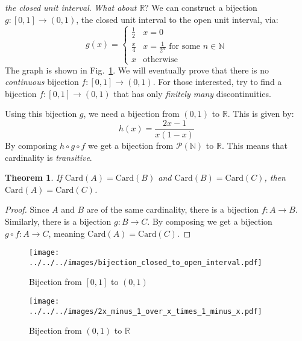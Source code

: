 \documentclass{article}
\theoremstyle{plain}
\newtheorem{theorem}{Theorem}[section]
\theoremstyle{normal}
\begin{document}
        \textit{the closed unit interval}. \textit{What about} $\mathbb{R}$?
        We can construct a bijection $g:[0,1]\rightarrow(0,1)$, the closed
        unit interval to the open unit interval, via:
        \begin{equation}
            g(x)=
            \begin{cases}
                \frac{1}{2}&x=0\\
                \frac{x}{4}&x=\frac{1}{2^{n}}\textrm{ for some }n\in\mathbb{N}\\
                x&\textrm{otherwise}
            \end{cases}
        \end{equation}
        The graph is shown in Fig.~\ref{fig:bijection_closed_to_open_interval}.
        We will eventually prove that there is no \textit{continuous} bijection
        $f:[0,1]\rightarrow(0,1)$. For those interested, try to find a
        bijection $f:[0,1]\rightarrow(0,1)$ that has only
        \textit{finitely many} discontinuities.
        \par\hfill\par
        Using this bijection $g$, we need a bijection from $(0,1)$ to
        $\mathbb{R}$. This is given by:
        \begin{equation}
            h(x)=\frac{2x-1}{x(1-x)}
        \end{equation}
        By composing $h\circ{g}\circ{f}$ we get a bijection from
        $\mathcal{P}(\mathbb{N})$ to $\mathbb{R}$. This means that cardinality
        is \textit{transitive}.
        \begin{theorem}
            If $\textrm{Card}(A)=\textrm{Card}(B)$ and
            $\textrm{Card}(B)=\textrm{Card}(C)$, then
            $\textrm{Card}(A)=\textrm{Card}(C)$.
        \end{theorem}
        \begin{proof}
            Since $A$ and $B$ are of the same cardinality, there is a
            bijection $f:A\rightarrow{B}$. Similarly, there is a bijection
            $g:B\rightarrow{C}$. By composing we get a bijection
            $g\circ{f}:A\rightarrow{C}$, meaning
            $\textrm{Card}(A)=\textrm{Card}(C)$.
        \end{proof}
        \begin{figure}
            \centering
            \texttt{[image: ../../../images/bijection\_closed\_to\_open\_interval.pdf]}
            \caption{Bijection from $[0,1]$ to $(0,1)$}
            \label{fig:bijection_closed_to_open_interval}
        \end{figure}
        \begin{figure}
            \centering
            \texttt{[image: ../../../images/2x\_minus\_1\_over\_x\_times\_1\_minus\_x.pdf]}
            \caption{Bijection from $(0,1)$ to $\mathbb{R}$}
            \label{fig:2x_minus_1_over_x_times_1_minus_x}
        \end{figure}
\end{document}
